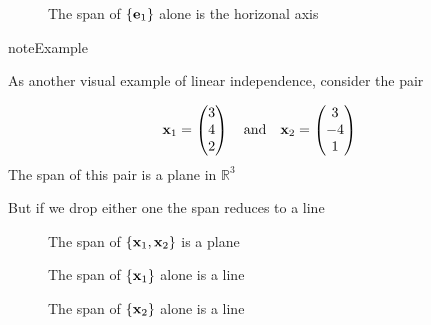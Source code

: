 \documentclass[letterpaper,10pt,english]{jupyterBook}
\begin{document}
\begin{figure}[htbp]
\centering
\capstart

\noindent{}
\caption{The span of \(\{{\bf e}_1\}\) alone is the horizonal axis}\label{\detokenize{05.linear_algebra:f-vec-h-axis}}\end{figure}

\begin{sphinxadmonition}{note}{Example}

\sphinxAtStartPar
As another visual example of linear independence, consider the pair
\end{sphinxadmonition}
\begin{equation*}
\begin{split}
%
{\bf x}_1 =
\begin{pmatrix}
3 \\
4 \\
2
\end{pmatrix}
\quad \text{and} \quad
{\bf x}_2 =
\begin{pmatrix}
3 \\
-4 \\
1
\end{pmatrix}
%
\end{split}
\end{equation*}
\sphinxAtStartPar
The span of this pair is a plane in \(\mathbb{R}^3\)

\sphinxAtStartPar
But if we drop either one the span reduces to a line

\begin{figure}[htbp]
\centering
\capstart

\noindent{}
\caption{The span of \(\{{\bf x}_1, {\bf x}_2\}\) is a plane}\label{\detokenize{05.linear_algebra:id5}}\end{figure}

\begin{figure}[htbp]
\centering
\capstart

\noindent{}
\caption{The span of \(\{{\bf x}_1\}\) alone is a line}\label{\detokenize{05.linear_algebra:id6}}\end{figure}

\begin{figure}[htbp]
\centering
\capstart

\noindent{}
\caption{The span of \(\{{\bf x}_2\}\) alone is a line}\label{\detokenize{05.linear_algebra:id7}}\end{figure}
\end{document}
